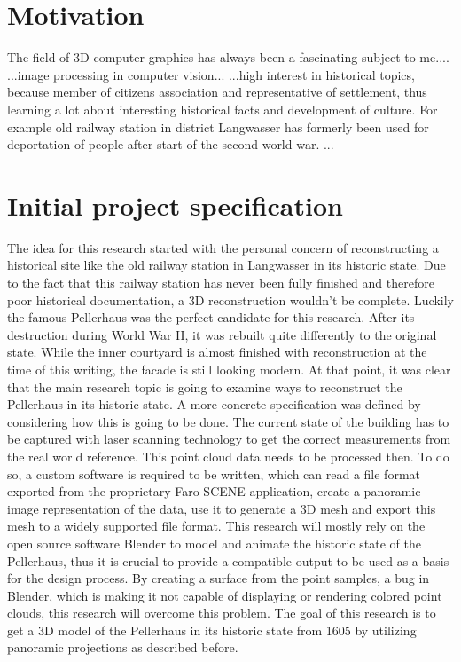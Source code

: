 \section{Motivation}

The field of 3D computer graphics has always been a fascinating subject to me....
...image processing in computer vision...
...high interest in historical topics, because member of citizens association and representative of settlement, thus learning a lot about interesting historical facts and development of culture. For example old railway station in district Langwasser has formerly been used for deportation of people after start of the second world war.
...

\section{Initial project specification}

The idea for this research started with the personal concern of reconstructing a historical site like the old railway station in Langwasser in its historic state. Due to the fact that this railway station has never been fully finished and therefore poor historical documentation, a 3D reconstruction wouldn't be complete. Luckily the famous Pellerhaus was the perfect candidate for this research. After its destruction during World War II, it was rebuilt quite differently to the original state. While the inner courtyard is almost finished with reconstruction at the time of this writing, the facade is still looking modern. At that point, it was clear that the main research topic is going to examine ways to reconstruct the Pellerhaus in its historic state.
A more concrete specification was defined by considering how this is going to be done. The current state of the building has to be captured with laser scanning technology to get the correct measurements from the real world reference. This point cloud data needs to be processed then. To do so, a custom software is required to be written, which can read a file format exported from the proprietary Faro SCENE application, create a panoramic image representation of the data, use it to generate a 3D mesh and export this mesh to a widely supported file format. This research will mostly rely on the open source software Blender to model and animate the historic state of the Pellerhaus, thus it is crucial to provide a compatible output to be used as a basis for the design process. By creating a surface from the point samples, a bug in Blender, which is making it not capable of displaying or rendering colored point clouds\parencite[see][p10]{webBlenderArtistsPointCloudSupport}, this research will overcome this problem. The goal of this research is to get a 3D model of the Pellerhaus in its historic state from 1605 by utilizing panoramic projections as described before.


